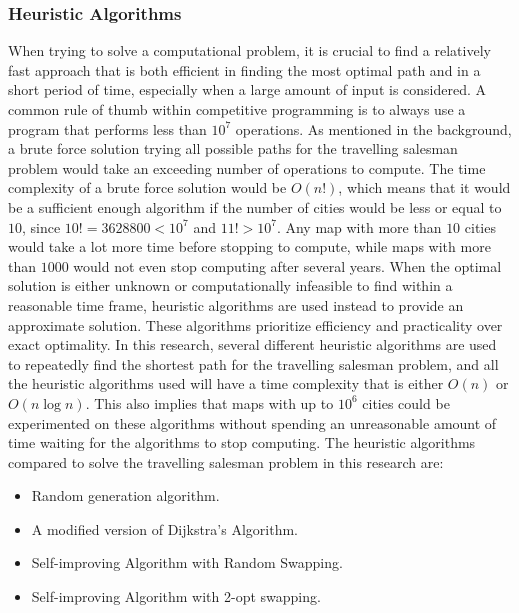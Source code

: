 \documentclass{article}
\begin{document}
\subsubsection{Heuristic Algorithms}\label{Heuristic}
When trying to solve a computational problem, it is crucial to find a relatively fast approach that is both efficient in finding the most optimal path and in a short period of time, especially when a large amount of input is considered. A common rule of thumb within competitive programming is to always use a program that performs less than $10^7$ operations.
\newline
As mentioned in the background, a brute force solution trying all possible paths for the travelling salesman problem would take an exceeding number of operations to compute. The time complexity of a brute force solution would be $O(n!)$, which means that it would be a sufficient enough algorithm if the number of cities would be less or equal to $10$, since $10! = 3628800 < 10^7$ and $11! > 10^7$. Any map with more than $10$ cities would take a lot more time before stopping to compute, while maps with more than $1000$ would not even stop computing after several years.
\newline
When the optimal solution is either unknown or computationally infeasible to find within a reasonable time frame, heuristic algorithms are used instead to provide an approximate solution. These algorithms prioritize efficiency and practicality over exact optimality. In this research, several different heuristic algorithms are used to repeatedly find the shortest path for the travelling salesman problem, and all the heuristic algorithms used will have a time complexity that is either $O(n)$ or $O(n \log{n})$. This also implies that maps with up to $10^6$ cities could be experimented on these algorithms without spending an unreasonable amount of time waiting for the algorithms to stop computing.
\newline
The heuristic algorithms compared to solve the travelling salesman problem in this research are:
\begin{itemize}
  \item Random generation algorithm.
  \item A modified version of Dijkstra's Algorithm.
  \item Self-improving Algorithm with Random Swapping.
  \item Self-improving Algorithm with 2-opt swapping.
\end{itemize}
\end{document}
